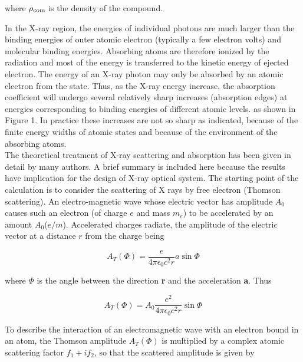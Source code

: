 \begin{flushleft}
where $\rho \textsubscript{com}$ is the density of the compound.
\end{flushleft}

In the X-ray region, the energies of individual photons are much larger than the binding energies of outer atomic electron (typically a few electron volts) and molecular binding energies. Absorbing atoms are therefore ionized by the radiation and most of the energy is transferred to the kinetic energy of ejected electron. The energy of an X-ray photon may only be absorbed by an atomic electron from the state. Thus, as the X-ray energy increase, the absorption coefficient will undergo several relatively sharp increases (absorption edges) at energies corresponding to binding energies of different atomic levels. as shown in Figure 1. In practice these increases are not so sharp as indicated, because of the finite energy widths of atomic states and because of the environment of the absorbing atoms.
\\
The theoretical treatment of X-ray scattering and absorption has been given in detail by many authors. A brief summary is included here because the results have implication for the design of X-ray optical system. The starting point of the calculation is to consider the scattering of X rays by free electron (Thomson scattering). An electro-magnetic wave whose electric vector has amplitude $A_0$ causes such an electron (of charge $e $ and mass $m_e $) to be accelerated by an amount $A_0 $($e / m $). Accelerated charges radiate, the amplitude of the electric vector at a distance $r $ from the charge being

\begin{equation}
A_T(\Phi) = \frac{e}{4 \pi \epsilon_0 c^2 r} a \sin \Phi
\label{eq: At1}
\end{equation}

\begin{flushleft}
where $\Phi $ is the angle between the direction \textbf{r} and the acceleration \textbf{a}. Thus
\end{flushleft}

\begin{equation}
A_T(\Phi) = A_0 \frac{e^2}{4 \pi \epsilon_0 c^2 r} \sin \Phi
\label{eq: At2}
\end{equation}

\begin{flushleft}
To describe the interaction of an electromagnetic wave with an electron bound in an atom, the Thomson amplitude $A_T (\Phi) $ is multiplied by a complex atomic scattering factor $f_1 + if_2 $, so that the scattered amplitude is given by
\end{flushleft}

